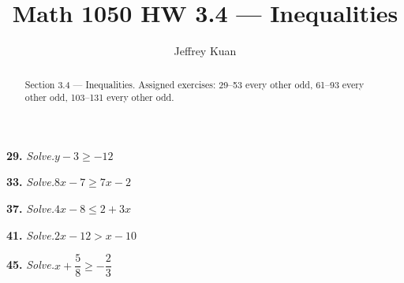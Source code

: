 \documentclass{ximera}
\author{Jeffrey Kuan}
\title{Math 1050 HW 3.4 --- Inequalities}
\begin{document}
\begin{abstract}
    Section 3.4 --- Inequalities.
    Assigned exercises: 29–53 every other odd, 61–93 every other odd, 103–131 every other odd.
\end{abstract}

\maketitle

\begin{problem}
\textbf{29.} \emph{Solve.}\quad $y - 3 \ge -12$

\begin{multipleChoice}
\end{multipleChoice}
\end{problem}

\begin{problem}
\textbf{33.} \emph{Solve.}\quad $8x - 7 \ge 7x - 2$

\begin{multipleChoice}
\end{multipleChoice}
\end{problem}

\begin{problem}
\textbf{37.} \emph{Solve.}\quad $4x - 8 \le 2 + 3x$

\begin{multipleChoice}
\end{multipleChoice}
\end{problem}

\begin{problem}
\textbf{41.} \emph{Solve.}\quad $2x - 12 > x - 10$

\begin{multipleChoice}
\end{multipleChoice}
\end{problem}

\begin{problem}
\textbf{45.} \emph{Solve.}\quad $x + \dfrac{5}{8} \ge -\dfrac{2}{3}$

\begin{multipleChoice}
\end{multipleChoice}
\end{problem}
\end{document}

